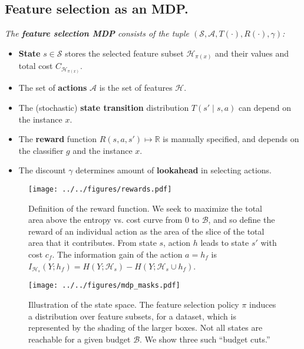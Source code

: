 \subsection{Feature selection as an MDP.}
{\itshape
The \textbf{feature selection MDP} consists of the tuple $(\mathcal{S}, \mathcal{A}, T(\cdot), R(\cdot), \gamma)$:
\begin{itemize}\addtolength{\itemsep}{-.55\baselineskip}
\item \textbf{State} $s \in \mathcal{S}$ stores the selected feature subset $\mathcal{H}_{\pi(x)}$ and their values and total cost $C_{\mathcal{H}_{\pi(x)}}$.
\item The set of \textbf{actions} $\mathcal{A}$ is the set of features $\mathcal{H}$.
\item The (stochastic) \textbf{state transition} distribution $T(s' \mid s, a)$ can depend on the instance $x$.
\item The \textbf{reward} function $R(s, a, s') \mapsto \mathbb{R}$ is manually specified, and depends on the classifier $g$ and the instance $x$.
\item The discount $\gamma$ determines amount of \textbf{lookahead} in selecting actions.
\end{itemize}
}

\vspace{1em}
\begin{figure}[ht!]
    \centering
    \texttt{[image: ../../figures/rewards.pdf]}
    \caption{Definition of the reward function.
    We seek to maximize the total area above the entropy vs. cost curve from $0$ to $\mathcal{B}$, and so define the reward of an individual action as the area of the slice of the total area that it contributes.
    From state $s$, action $h$ leads to state $s'$ with cost $c_f$.
    The information gain of the action $a = h_f$ is $I_{\mathcal{H}_s}(Y; h_f) = H(Y; \mathcal{H}_s) - H(Y; \mathcal{H}_s \cup {h_f})$.
    \label{fig:rewards}
    }

    \texttt{[image: ../../figures/mdp\_masks.pdf]}
    \caption{
    Illustration of the state space.
    The feature selection policy $\pi$ induces a distribution over feature subsets, for a dataset, which is represented by the shading of the larger boxes.
    Not all states are reachable for a given budget $\mathcal{B}$.
    We show three such ``budget cuts.''
    \label{fig:state_space}
    }
\end{figure}

